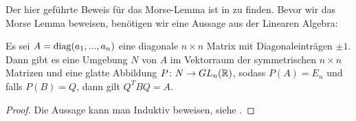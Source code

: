 Der hier geführte Beweis für das Morse-Lemma ist in \cite{hirsch} zu finden. 
Bevor wir das Morse Lemma beweisen, benötigen wir eine Aussage aus der Linearen Algebra:

\begin{lemma}
    \label{lemma: lina lemma}
    Es sei $A = { \operatorname{diag} }(a_1, ..., a_n)$ eine diagonale $n \times n$ Matrix mit 
    Diagonaleinträgen $\pm 1$. Dann gibt es eine Umgebung $N$ von $A$ im Vektorraum der 
    symmetrischen $n \times n$ Matrizen und eine glatte Abbildung 
    $P \colon N \to GL_n({ \mathbb R })$, sodass $P(A) = E_n$ und falls $P(B) = Q$, dann gilt 
    $Q^TBQ = A$.
\end{lemma}

\begin{proof}
    Die Aussage kann man Induktiv beweisen, siehe \cite{hirsch}.
\end{proof}

